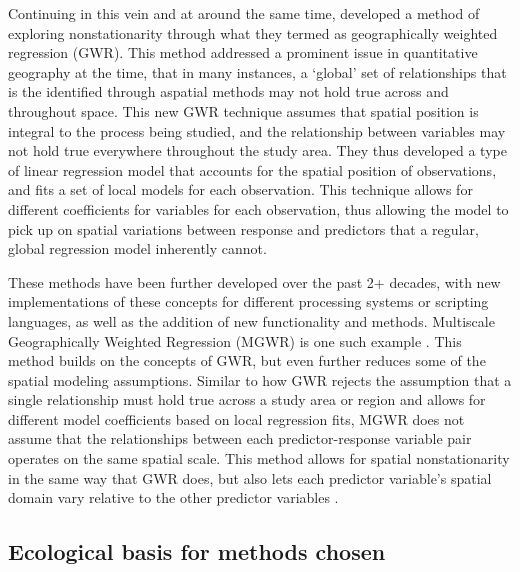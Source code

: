\documentclass[12pt,a4paper]{article}
\begin{document}
Continuing in this vein and at around the same time, \cite{brunsdon1996geographically} developed a method of exploring nonstationarity through what they termed as geographically weighted regression (GWR).  This method addressed a prominent issue in quantitative geography at the time, that in many instances, a `global' set of relationships that is the identified through aspatial methods may not hold true across and throughout space.  This new GWR technique assumes that spatial position is integral to the process being studied, and the relationship between variables may not hold true everywhere throughout the study area.  They thus developed a type of linear regression model that accounts for the spatial position of observations, and fits a set of local models for each observation.  This technique allows for different coefficients for variables for each observation, thus allowing the model to pick up on spatial variations between response and predictors that a regular, global regression model inherently cannot.  

These methods have been further developed over the past 2+ decades, with new implementations of these concepts for different processing systems or scripting languages, as well as the addition of new functionality and methods.  Multiscale Geographically Weighted Regression (MGWR) is one such example \citep{fotheringham2017multiscale,oshan2019mgwr}.  This method builds on the concepts of GWR, but even further reduces some of the spatial modeling assumptions.  Similar to how GWR rejects the assumption that a single relationship must hold true across a study area or region and allows for different model coefficients based on local regression fits, MGWR does not assume that the relationships between each predictor-response variable pair operates on the same spatial scale.  This method allows for spatial nonstationarity in the same way that GWR does, but also lets each predictor variable's spatial domain vary relative to the other predictor variables \citep{fotheringham2017multiscale}.

\subsection{Ecological basis for methods chosen}\label{eco_lit}
\end{document}
